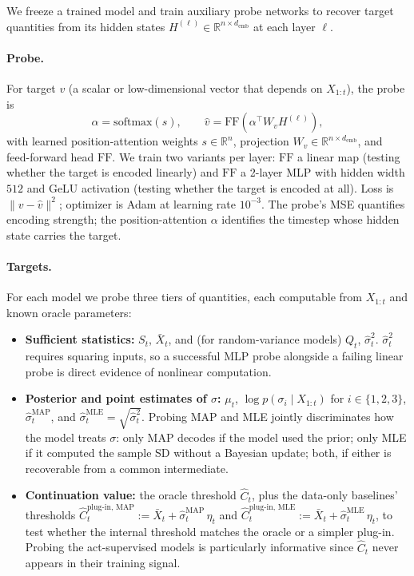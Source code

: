 \documentclass[11pt]{article}
\begin{document}
We freeze a trained model and train auxiliary probe networks to recover target quantities from its hidden states $H^{(\ell)} \in \mathbb{R}^{n \times d_{\mathrm{emb}}}$ at each layer $\ell$.

\paragraph{Probe.} For target $v$ (a scalar or low-dimensional vector that depends on $X_{1:t}$), the probe is
\[
\alpha = \mathrm{softmax}(s), \qquad \hat v = \mathrm{FF}(\alpha^\top W_v H^{(\ell)}),
\]
with learned position-attention weights $s \in \mathbb{R}^n$, projection $W_v \in \mathbb{R}^{n \times d_{\mathrm{emb}}}$, and feed-forward head $\mathrm{FF}$. We train two variants per layer: $\mathrm{FF}$ a linear map (testing whether the target is encoded linearly) and $\mathrm{FF}$ a 2-layer MLP with hidden width $512$ and GeLU activation (testing whether the target is encoded at all). Loss is $\|v - \hat v\|^2$; optimizer is Adam at learning rate $10^{-3}$. The probe's MSE quantifies encoding strength; the position-attention $\alpha$ identifies the timestep whose hidden state carries the target.

\paragraph{Targets.} For each model we probe three tiers of quantities, each computable from $X_{1:t}$ and known oracle parameters:
\begin{itemize}
\item \textbf{Sufficient statistics:} $S_t$, $\bar X_t$, and (for random-variance models) $Q_t$, $\hat\sigma_t^2$. $\hat\sigma_t^2$ requires squaring inputs, so a successful MLP probe alongside a failing linear probe is direct evidence of nonlinear computation.
\item \textbf{Posterior and point estimates of $\sigma$:} $\mu_t$, $\log p(\sigma_i \mid X_{1:t})$ for $i \in \{1, 2, 3\}$, $\hat\sigma_t^{\mathrm{MAP}}$, and $\hat\sigma_t^{\mathrm{MLE}} = \sqrt{\hat\sigma_t^2}$. Probing MAP and MLE jointly discriminates how the model treats $\sigma$: only MAP decodes if the model used the prior; only MLE if it computed the sample SD without a Bayesian update; both, if either is recoverable from a common intermediate.
\item \textbf{Continuation value:} the oracle threshold $\widehat C_t$, plus the data-only baselines' thresholds $\widehat C_t^{\mathrm{plug\text{-}in,\,MAP}} := \bar X_t + \hat\sigma_t^{\mathrm{MAP}}\,\eta_t$ and $\widehat C_t^{\mathrm{plug\text{-}in,\,MLE}} := \bar X_t + \hat\sigma_t^{\mathrm{MLE}}\,\eta_t$, to test whether the internal threshold matches the oracle or a simpler plug-in. Probing the act-supervised models is particularly informative since $\widehat C_t$ never appears in their training signal.
\end{itemize}
\end{document}
